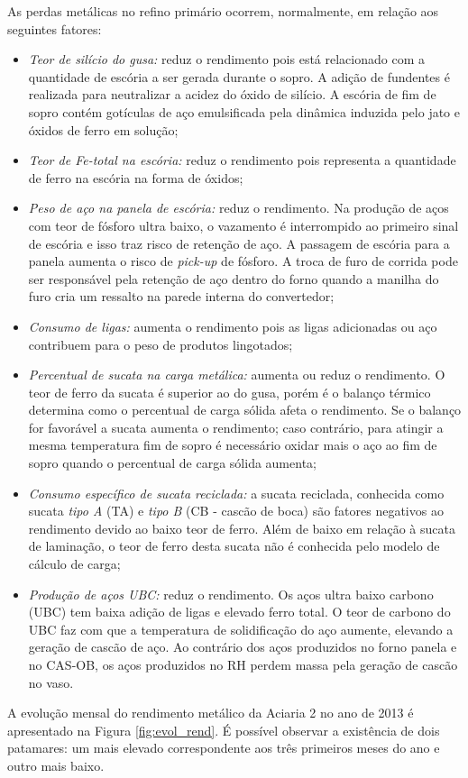 \begin{multicols}{2}
	As perdas metálicas no refino primário ocorrem, normalmente, em relação aos seguintes fatores:
	\begin{itemize} \itemsep4pt \parskip0pt 
		\item{\emph{Teor de silício do gusa:} reduz o rendimento pois está relacionado com a quantidade de escória a ser gerada durante o sopro. A adição de fundentes é realizada para neutralizar a acidez do óxido de silício. A escória de fim de sopro contém gotículas de aço emulsificada pela dinâmica induzida pelo jato e óxidos de ferro em solução;}
		\item{\emph{Teor de Fe-total na escória:} reduz o rendimento pois representa a quantidade de ferro na escória na forma de óxidos;}		
		\item{\emph{Peso de aço na panela de escória: } reduz o rendimento. Na produção de aços com teor de fósforo ultra baixo, o vazamento é interrompido ao primeiro sinal de escória e isso traz risco de retenção de aço. A passagem de escória para a panela aumenta o risco de \textit{pick-up} de fósforo. A troca de furo de corrida pode ser responsável pela retenção de aço dentro do forno quando a manilha do furo cria um ressalto na parede interna do convertedor;}
		\item{\emph{Consumo de ligas: } aumenta o rendimento pois as ligas adicionadas ou aço contribuem para o peso de produtos lingotados;}
		\item{\emph{Percentual de sucata na carga metálica: } aumenta ou reduz o rendimento. O teor de ferro da sucata é superior ao do gusa, porém é o balanço térmico determina como o percentual de carga sólida afeta o rendimento. Se o balanço for favorável a sucata aumenta o rendimento; caso contrário, para atingir a mesma temperatura fim de sopro é necessário oxidar mais o aço ao fim de sopro quando o percentual de carga sólida aumenta;}
		\item{\emph{Consumo específico de sucata reciclada: } a sucata reciclada, conhecida como sucata \textit{tipo A} (TA) e \textit{tipo B} (CB - cascão de boca) são fatores negativos ao rendimento devido ao baixo teor de ferro. Além de baixo em relação à sucata de laminação, o teor de ferro desta sucata não é conhecida pelo modelo de cálculo de carga;}
		\item{\emph{Produção de aços UBC:} reduz o rendimento. Os aços ultra baixo carbono (UBC) tem baixa adição de ligas e elevado ferro total. O teor de carbono do UBC faz com que a temperatura de solidificação do aço aumente, elevando a geração de cascão de aço. Ao contrário dos aços produzidos no forno panela e no CAS-OB, os aços produzidos no RH perdem massa pela geração de cascão no vaso.}
	\end{itemize}
	A evolução mensal do rendimento metálico da Aciaria 2 no ano de 2013 é apresentado na Figura \ref{fig:evol_rend}\cite{rel2}. É possível observar a existência de dois patamares: um mais elevado correspondente aos três primeiros meses do ano e outro mais baixo. 	

\end{multicols}
